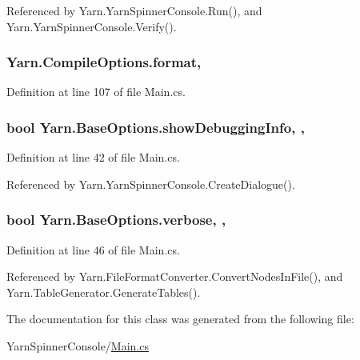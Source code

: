 Referenced by Yarn.\-Yarn\-Spinner\-Console.\-Run(), and Yarn.\-Yarn\-Spinner\-Console.\-Verify().

\hypertarget{a00057_a9904ccfb1b0ff64df415c4fc9fe6eb1c}{
\subsubsection[{format}]{ Yarn.\-Compile\-Options.\-format\hspace{0.3cm}{\ttfamily [get]}, {\ttfamily [set]}}}\label{a00057_a9904ccfb1b0ff64df415c4fc9fe6eb1c}


Definition at line 107 of file Main.\-cs.

\hypertarget{a00043_a89964ea17bd19caf00cb5bff563ed01c}{
\subsubsection[{show\-Debugging\-Info}]{\setlength{\rightskip}{0pt plus 5cm}bool Yarn.\-Base\-Options.\-show\-Debugging\-Info\hspace{0.3cm}{\ttfamily [get]}, {\ttfamily [set]}, {\ttfamily [inherited]}}}\label{a00043_a89964ea17bd19caf00cb5bff563ed01c}


Definition at line 42 of file Main.\-cs.



Referenced by Yarn.\-Yarn\-Spinner\-Console.\-Create\-Dialogue().

\hypertarget{a00043_ada4d83d1756918f362d55f6649b82b17}{
\subsubsection[{verbose}]{\setlength{\rightskip}{0pt plus 5cm}bool Yarn.\-Base\-Options.\-verbose\hspace{0.3cm}{\ttfamily [get]}, {\ttfamily [set]}, {\ttfamily [inherited]}}}\label{a00043_ada4d83d1756918f362d55f6649b82b17}


Definition at line 46 of file Main.\-cs.



Referenced by Yarn.\-File\-Format\-Converter.\-Convert\-Nodes\-In\-File(), and Yarn.\-Table\-Generator.\-Generate\-Tables().



The documentation for this class was generated from the following file\-:\begin{DoxyCompactItemize}
\item 
Yarn\-Spinner\-Console/\hyperlink{a00328}{Main.\-cs}\end{DoxyCompactItemize}
